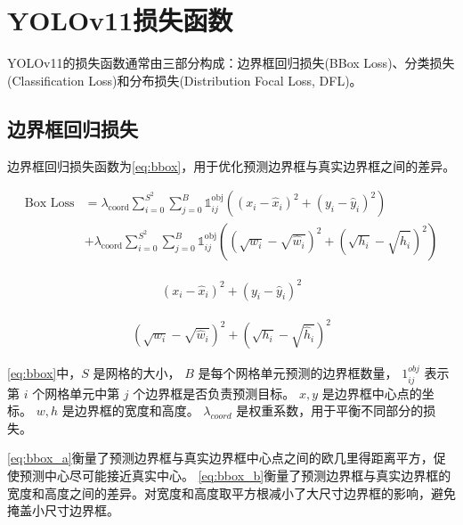 \section{YOLOv11损失函数}
YOLOv11的损失函数通常由三部分构成：边界框回归损失(BBox Loss)、分类损失(Classification Loss)和分布损失(Distribution Focal Loss, DFL)。

\subsection{边界框回归损失}
边界框回归损失函数为\ref{eq:bbox}，用于优化预测边界框与真实边界框之间的差异。

\begin{equation}
  \begin{aligned}
  \text{Box Loss} &= \lambda_{\text{coord}} \sum_{i = 0}^{S^2} \sum_{j = 0}^{B} \mathbb{1}_{ij}^{\text{obj}} \left( (x_i - \hat{x}_i)^2 + (y_i - \hat{y}_i)^2 \right) \\
  &+ \lambda_{\text{coord}} \sum_{i = 0}^{S^2} \sum_{j = 0}^{B} \mathbb{1}_{ij}^{\text{obj}} \left( (\sqrt{w_i} - \sqrt{\hat{w}_i})^2 + (\sqrt{h_i} - \sqrt{\hat{h}_i})^2 \right) \label{eq:bbox}
  \end{aligned}
\end{equation}

\begin{equation}
  \begin{aligned}
    (x_i - \hat{x}_i)^2 + (y_i - \hat{y}_i)^2 \label{eq:bbox_a}
  \end{aligned}
\end{equation}

\begin{equation}
  \begin{aligned}
    (\sqrt{w_i} - \sqrt{\hat{w}_i})^2 + (\sqrt{h_i} - \sqrt{\hat{h}_i})^2 \label{eq:bbox_b}
  \end{aligned}
\end{equation}


\ref{eq:bbox}中，$S$ 是网格的大小，
$B$ 是每个网格单元预测的边界框数量，
$1_{ij}^{obj}$ 表示第 $i$ 个网格单元中第 $j$ 个边界框是否负责预测目标。
$x, y$ 是边界框中心点的坐标。
$w, h$ 是边界框的宽度和高度。
$\lambda_{coord}$ 是权重系数，用于平衡不同部分的损失。

\ref{eq:bbox_a}衡量了预测边界框与真实边界框中心点之间的欧几里得距离平方，促使预测中心尽可能接近真实中心。
\ref{eq:bbox_b}衡量了预测边界框与真实边界框的宽度和高度之间的差异。对宽度和高度取平方根减小了大尺寸边界框的影响，避免掩盖小尺寸边界框。


